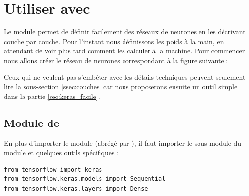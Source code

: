 \documentclass[11pt,class=report,crop=false]{standalone}
\begin{document}








\section{Utiliser \tensorflow{} avec \keras}

Le module \keras{} permet de définir facilement des réseaux de neurones en les décrivant couche par couche.
Pour l'instant nous définissons les poids à la main, en attendant de voir plus tard comment les calculer à la machine.
Pour commencer nous allons créer le réseau de neurones correspondant à la figure suivante :



Ceux qui ne veulent pas s'embêter avec les détails techniques peuvent seulement lire la sous-section \ref{ssec:couches} car nous proposerons ensuite un outil simple dans la partie \ref{sec:keras_facile}.


\subsection{Module \keras{} de \tensorflow{}}
\label{ssec:keras}

En plus d'importer le module  (abrégé par ), il faut importer le sous-module  du module  et quelques outils spécifiques :

\begin{lstlisting}
from tensorflow import keras
from tensorflow.keras.models import Sequential
from tensorflow.keras.layers import Dense
\end{lstlisting} 
\end{document}
